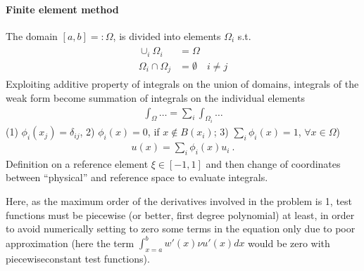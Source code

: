 \documentclass[letterpaper,10pt,english]{jupyterBook}
\begin{document}
\paragraph{Finite element method}
\label{\detokenize{ch/pde/fem-poisson-1d:finite-element-method}}
\sphinxAtStartPar
{} The domain \([a,b] =: \Omega\), is divided into elements \(\Omega_i\) s.t.
\begin{equation*}
\begin{split}\begin{aligned}
  \cup_i \Omega_i        & = \Omega \\
  \Omega_i \cap \Omega_j & = \emptyset \quad i \ne j
\end{aligned}\end{split}
\end{equation*}
\sphinxAtStartPar
Exploiting additive property of integrals on the union of domains, integrals of the weak form become summation of integrals on the individual elements
\begin{equation*}
\begin{split}\int_{\Omega} \dots = \sum_i \int_{\Omega_i} \dots \end{split}
\end{equation*}
\sphinxAtStartPar
{}  (1) \(\phi_i(x_j) = \delta_{ij}\), 2) \(\phi_i(x) = 0\), if \(x \notin B(x_i)\); 3) \(\sum_i \phi_i(x) = 1\), \(\forall x \in \Omega\))
\begin{equation*}
\begin{split}u(x) = \sum_i \phi_i(x) u_i \ .\end{split}
\end{equation*}
\sphinxAtStartPar
Definition on a reference element \(\xi \in [-1, 1]\) and then change of coordinates between “physical” and reference space to evaluate integrals.

\sphinxAtStartPar
Here, as the maximum order of the derivatives involved in the problem is 1, test functions must be piecewise\sphinxhyphen{} (or better, first degree polynomial) at least, in order to avoid numerically setting to zero some terms in the equation only due to poor approximation (here the term \(\int_{x=a}^{b} w'(x) \nu u'(x) dx\) would be zero with piecewise\sphinxhyphen{}constant test functions).
\end{document}
